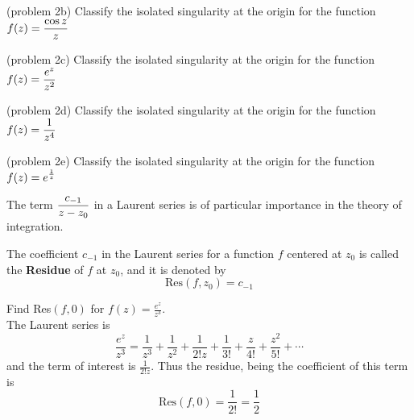\documentclass[handout]{ximera}
\begin{document}
\begin{problem}(problem 2b)
Classify the isolated singularity at the origin for the function $\displaystyle f(z) = \frac{\cos z}{z}$
\begin{multipleChoice}
\end{multipleChoice}\end{problem}


\begin{problem}(problem 2c)
Classify the isolated singularity at the origin for the function $\displaystyle f(z) = \frac{e^z}{z^2}$
\begin{multipleChoice}
\end{multipleChoice}
\end{problem}


\begin{problem}(problem 2d)
Classify the isolated singularity at the origin for the function $\displaystyle f(z) = \frac{1}{z^4}$
\begin{multipleChoice}
\end{multipleChoice}
\end{problem}


\begin{problem}(problem 2e)
Classify the isolated singularity at the origin for the function $\displaystyle f(z) = e^\frac{1}{z}$
\begin{multipleChoice}
\end{multipleChoice}\end{problem}

The term $\displaystyle \frac{c_{-1}}{z-z_0}$ in a Laurent series is of particular importance in the theory of integration.

\begin{definition}
The coefficient $c_{-1}$ in the Laurent series for a function $f$ centered at $z_0$ is called the {\bf Residue} of $f$ at $z_0$, and it is denoted by
\[
\text{Res}(f,z_0) = c_{-1}
\]
\end{definition}


\begin{example}[example 3]
Find Res$(f,0)$ for $f(z) = \frac{e^z}{z^3}$.\\
The Laurent series is
\[
\frac{e^z}{z^3} = \frac{1}{z^3} + \frac{1}{z^2} + \frac{1}{2!z} + \frac{1}{3!} + \frac{z}{4!} + \frac{z^2}{5!} + \cdots
\]
and the term of interest is $ \frac{1}{2!z}$. Thus the residue, being the coefficient of this term is
\[
\text{Res}(f,0) = \frac{1}{2!} = \frac12
\]
\end{example}
\end{document}
